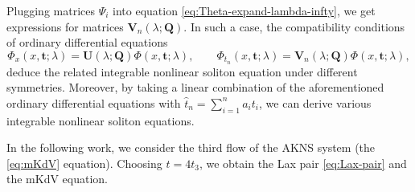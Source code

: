 \documentclass[11pt,reqno]{amsart}
\numberwithin{equation}{section}
\begin{document}
Plugging matrices $\Psi_i$ into equation \eqref{eq:Theta-expand-lambda-infty}, we get expressions for matrices $\mathbf{V}_n(\lambda;\mathbf{Q})$. 
In such a case, the compatibility conditions of ordinary differential equations
\begin{equation}\nonumber
	\Phi_{x}(x,\mathbf{t};\lambda)=\mathbf{U}(\lambda;\mathbf{Q})\Phi(x,\mathbf{t};\lambda), \qquad \Phi_{t_n}(x,\mathbf{t};\lambda)=\mathbf{V}_n(\lambda;\mathbf{Q})\Phi(x,\mathbf{t};\lambda),
\end{equation} 
deduce the related integrable nonlinear soliton equation \cite{Wright-19} under different symmetries. 
Moreover, by taking a linear combination of the aforementioned ordinary differential equations with $\hat{t}_{n}=\sum_{i=1}^{n}a_{i}t_i$, we can derive various integrable nonlinear soliton equations. 

In the following work, we consider the third flow of the AKNS system (the \ref{eq:mKdV} equation).
Choosing $t=4t_3$, we obtain the Lax pair \eqref{eq:Lax-pair} and the mKdV equation. 
\end{document}
